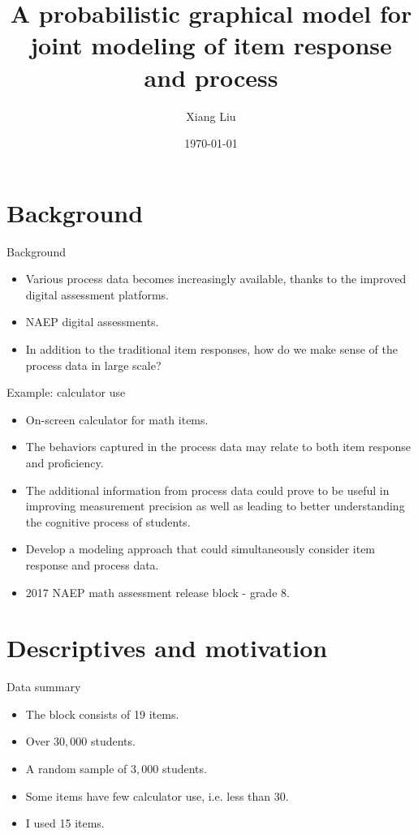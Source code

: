 \documentclass[xcolor=dvipsnames,12pt]{beamer}
\title{A probabilistic graphical model for joint modeling of item response and process}
\author{Xiang Liu}
\institute{Educational Testing Service}
\date{\today}
\begin{document}
  \titlepage
  
  \begin{frame}
    \tableofcontents
  \end{frame}
  
  \section{Background}
  \begin{frame}{Background}
    \begin{itemize}
      \item Various process data becomes increasingly available, thanks to the improved digital assessment platforms.
      \item NAEP digital assessments.
      \item In addition to the traditional item responses, how do we make sense of the process data in large scale?
    \end{itemize}
  \end{frame}

  \begin{frame}{Example: calculator use}
    \begin{itemize}
      \item On-screen calculator for math items.
      \item The behaviors captured in the process data may relate to both item response and proficiency.
      \item The additional information from process data could prove to be useful in improving measurement precision as well as leading to better understanding the cognitive process of students.
      \item Develop a modeling approach that could simultaneously consider item response and process data.
      \item 2017 NAEP math assessment release block - grade 8.
    \end{itemize}
  \end{frame}

  \section{Descriptives and motivation}
  \begin{frame}{Data summary}
    \begin{itemize}
      \item The block consists of 19 items.
      \item Over $30,000$ students.
      \item A random sample of $3,000$ students.
      \item Some items have few calculator use, i.e. less than 30.
      \item I used 15 items.
    \end{itemize}
  \end{frame}
\end{document}
